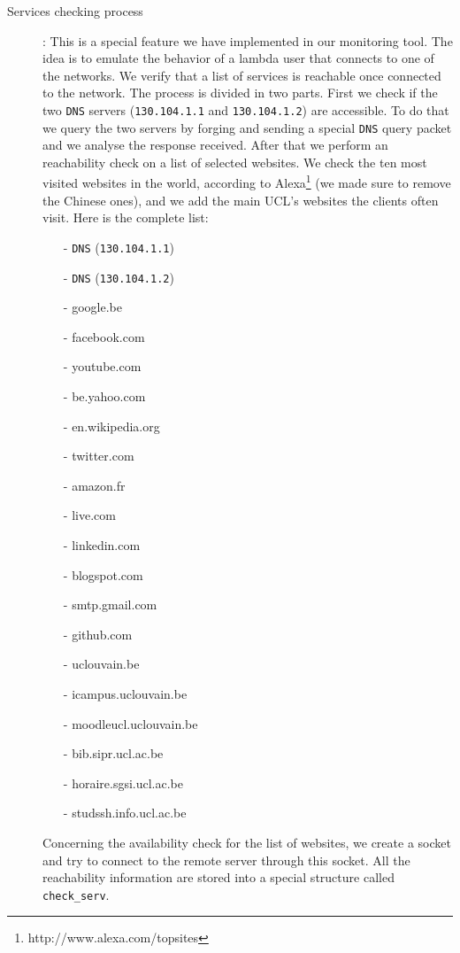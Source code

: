\begin{description}
	\item[Services checking process]: This is a special feature we have implemented in our monitoring tool. The idea is to emulate the behavior of a lambda user that connects to one of the networks. We verify that a list of services is reachable once connected to the network. The process is divided in two parts. First we check if the two \texttt{DNS} servers (\texttt{130.104.1.1} and \texttt{130.104.1.2}) are accessible. To do that we query the two servers by forging and sending a special \texttt{DNS} query packet and we analyse the response received. After that we perform an reachability check on a list of selected websites. We check the ten most visited websites in the world, according to Alexa\footnote{http://www.alexa.com/topsites} (we made sure to remove the Chinese ones), and we add the main UCL's websites the clients often visit. Here is the complete list:
	\begin{itemize}
		\item[-] \texttt{DNS} (\texttt{130.104.1.1})
		\item[-] \texttt{DNS} (\texttt{130.104.1.2})
		\item[-] google.be
		\item[-] facebook.com
		\item[-] youtube.com
		\item[-] be.yahoo.com
		\item[-] en.wikipedia.org
		\item[-] twitter.com
		\item[-] amazon.fr
		\item[-] live.com
		\item[-] linkedin.com
		\item[-] blogspot.com
		\item[-] smtp.gmail.com
		\item[-] github.com
		\item[-] uclouvain.be
		\item[-] icampus.uclouvain.be
		\item[-] moodleucl.uclouvain.be
		\item[-] bib.sipr.ucl.ac.be
		\item[-] horaire.sgsi.ucl.ac.be
		\item[-] studssh.info.ucl.ac.be
	\end{itemize}

	Concerning the availability check for the list of websites, we create a socket and try to connect to the remote server through this socket. All the reachability information are stored into a special structure called \texttt{check\_serv}.


\end{description}
